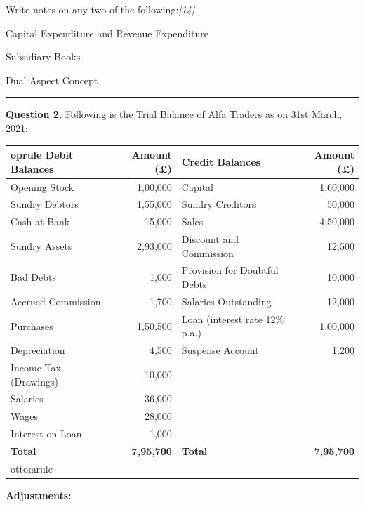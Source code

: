 \documentclass[11pt,a4paper]{article}
\newcommand{\pts}[1]{\hfill   \textit{[#1]}}
\begin{document}
Write notes on any two of the following:\pts{14}

\begin{parts}
  \item Capital Expenditure and Revenue Expenditure
  \item Subsidiary Books
  \item Dual Aspect Concept
\end{parts}

\medskip\rule{\linewidth}{0.2pt}


\newpage




\noindent   \textbf{Question 2.}
Following is the Trial Balance of Alfa Traders as on 31st March, 2021:


\begin{center}

\begin{tabular}{lr|lr}
 oprule
   \textbf{Debit Balances} &   \textbf{Amount (\pounds)} &   \textbf{Credit Balances} &   \textbf{Amount (\pounds)} \\
\midrule
Opening Stock & 1,00,000 & Capital & 1,60,000 \\
Sundry Debtors & 1,55,000 & Sundry Creditors & 50,000 \\
Cash at Bank & 15,000 & Sales & 4,50,000 \\
Sundry Assets & 2,93,000 & Discount and Commission & 12,500 \\
Bad Debts & 1,000 & Provision for Doubtful Debts & 10,000 \\
Accrued Commission & 1,700 & Salaries Outstanding & 12,000 \\
Purchases & 1,50,500 & Loan (interest rate 12\% p.a.) & 1,00,000 \\
Depreciation & 4,500 & Suspense Account & 1,200 \\
Income Tax (Drawings) & 10,000 & & \\
Salaries & 36,000 & & \\
Wages & 28,000 & & \\
Interest on Loan & 1,000 & & \\
\midrule
   \textbf{Total} &   \textbf{7,95,700} &   \textbf{Total} &   \textbf{7,95,700} \\
ottomrule
\end{tabular}
\end{center}




\noindent   \textbf{Adjustments:}
\end{document}
